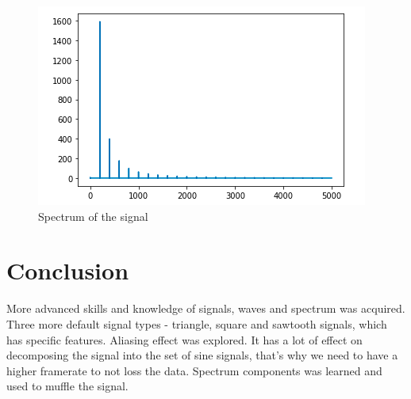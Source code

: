 \documentclass[a4paper]{article}
\begin{document}
            \begin{figure}[H]
                \centering
                \includegraphics[width=\textwidth]{img/spec_f2.png}
                \caption{Spectrum of the signal}
                \label{fig:part5_1}
            \end{figure}
    
    \newpage
        \section{Conclusion}
            More advanced skills and knowledge of signals, waves and spectrum was acquired. Three more default signal types - triangle, square and sawtooth signals, which has specific features. Aliasing effect was explored. It has a lot of effect on decomposing the signal into the set of sine signals, that's why we need to have a higher framerate to not loss the data. Spectrum components was learned and used to muffle the signal.
            
            
    
\end{document}
